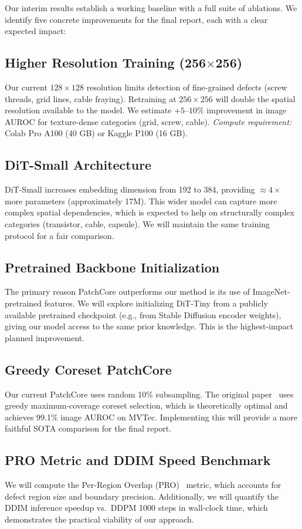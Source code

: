 \documentclass[11pt,letterpaper]{article}
\newcommand{\auroc}{\textsc{AUROC}}
\begin{document}
Our interim results establish a working baseline with a full suite of ablations. We
identify five concrete improvements for the final report, each with a clear expected impact:

\subsection{Higher Resolution Training (256$\times$256)}
Our current $128 \times 128$ resolution limits detection of fine-grained defects
(screw threads, grid lines, cable fraying). Retraining at $256 \times 256$ will double
the spatial resolution available to the model. We estimate $+5$--$10\%$ improvement in
image \auroc{} for texture-dense categories (grid, screw, cable).
\textit{Compute requirement:} Colab Pro A100 (40 GB) or Kaggle P100 (16 GB).

\subsection{DiT-Small Architecture}
DiT-Small increases embedding dimension from 192 to 384, providing $\approx 4\times$ more
parameters (approximately 17M). This wider model can capture more complex spatial
dependencies, which is expected to help on structurally complex categories (transistor,
cable, capsule). We will maintain the same training protocol for a fair comparison.

\subsection{Pretrained Backbone Initialization}
The primary reason PatchCore outperforms our method is its use of ImageNet-pretrained
features. We will explore initializing DiT-Tiny from a publicly available pretrained
checkpoint (e.g., from Stable Diffusion encoder weights), giving our model access to
the same prior knowledge. This is the highest-impact planned improvement.

\subsection{Greedy Coreset PatchCore}
Our current PatchCore uses random 10\% subsampling. The original paper~\cite{patchcore2022}
uses greedy maximum-coverage coreset selection, which is theoretically optimal and
achieves 99.1\% image \auroc{} on MVTec. Implementing this will provide a more faithful
SOTA comparison for the final report.

\subsection{PRO Metric and DDIM Speed Benchmark}
We will compute the Per-Region Overlap (PRO)~\cite{mvtec_pro} metric, which accounts for
defect region size and boundary precision. Additionally, we will quantify the DDIM inference
speedup vs.\ DDPM 1000 steps in wall-clock time, which demonstrates the practical
viability of our approach.
\end{document}
